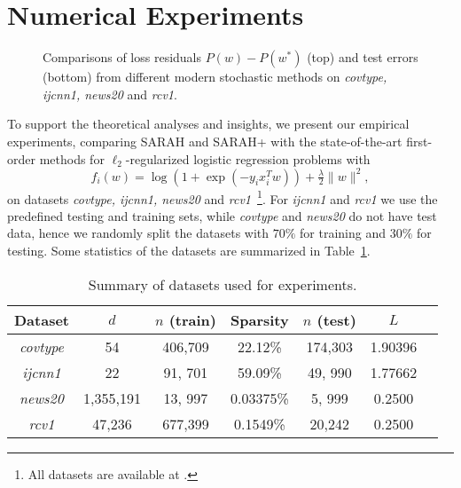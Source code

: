 \documentclass{article}
\begin{document}
\section{Numerical Experiments} 
 \begin{figure*} 
\centering


 \caption{\footnotesize Comparisons of loss residuals $P(w) - P(w^*)$ (top) and test errors (bottom) from different modern stochastic methods on \emph{covtype, ijcnn1, news20} and \emph{rcv1}.}
   \label{fig:test_errors}
 \end{figure*}

To support the theoretical analyses and insights, we present our empirical experiments, comparing SARAH and SARAH+  with the state-of-the-art first-order methods for $\ell_2$-regularized logistic regression problems with 
$$f_i(w) = \log (1+\exp(-y_ix_i^Tw)) + \tfrac{\lambda}{2}\|w\|^2,$$
on datasets \emph{covtype, ijcnn1, news20} and \emph{rcv1}~\footnote{All datasets are available at .}. For \emph{ijcnn1} and \emph{rcv1}  we use the predefined testing and training sets, while  \emph{covtype} and \emph{news20} do not have  test data, hence we randomly   split the  datasets with $70\%$ for training and $30\%$ for testing. Some statistics of the datasets are summarized in Table~\ref{table:datasets}.
\begin{table} 
\scriptsize
\centering
\caption{Summary of datasets used for experiments.}
\label{table:datasets}
\begin{tabular}{|c|c|c|c|c|c|c|}
\hline
Dataset  & $d$  & $n$ (train) & Sparsity  & $n$ (test)   & $L$ \\
\hline \hline 
\emph{covtype} & 54  & 406,709  & 22.12\% & 174,303 & 1.90396 \\
\hline 
\emph{ijcnn1} & 22  & 91, 701  & 59.09\% & 49, 990 & 1.77662 \\
\hline
\emph{news20} & 1,355,191  & 13, 997  & 0.03375\% & 5, 999 & 0.2500 \\
\hline
\emph{rcv1} & 47,236 & 677,399 & 0.1549\%  & 20,242 & 0.2500\\
\hline 
\end{tabular}
\end{table}
\end{document}
